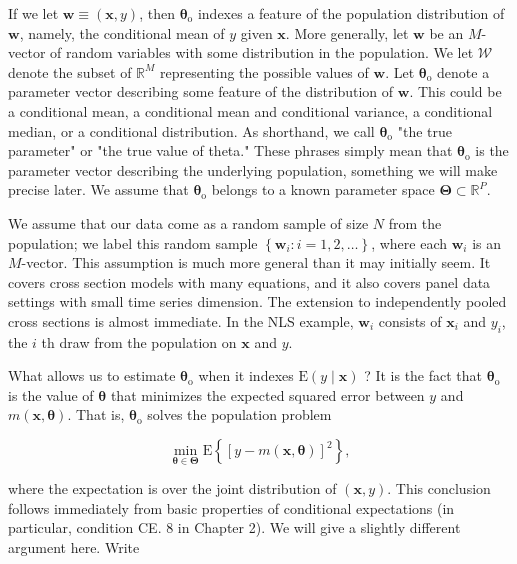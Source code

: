 \documentclass[10pt]{article}
\begin{document}
If we let $\mathbf{w} \equiv(\mathbf{x}, y)$, then $\boldsymbol{\theta}_{\mathrm{o}}$ indexes a feature of the population distribution of $\mathbf{w}$, namely, the conditional mean of $y$ given $\mathbf{x}$. More generally, let $\mathbf{w}$ be an $M$-vector of random variables with some distribution in the population. We let $\mathscr{W}$ denote the subset of $\mathbb{R}^{M}$ representing the possible values of $\mathbf{w}$. Let $\boldsymbol{\theta}_{\mathrm{o}}$ denote a parameter vector describing some feature of the distribution of $\mathbf{w}$. This could be a conditional mean, a conditional mean and conditional variance, a conditional median, or a conditional distribution. As shorthand, we call $\boldsymbol{\theta}_{\mathrm{o}}$ "the true parameter" or "the true value of theta." These phrases simply mean that $\boldsymbol{\theta}_{\mathrm{o}}$ is the parameter vector describing the underlying population, something we will make precise later. We assume that $\boldsymbol{\theta}_{\mathrm{o}}$ belongs to a known parameter space $\boldsymbol{\Theta} \subset \mathbb{R}^{P}$.

We assume that our data come as a random sample of size $N$ from the population; we label this random sample $\left\{\mathbf{w}_{i}: i=1,2, \ldots\right\}$, where each $\mathbf{w}_{i}$ is an $M$-vector. This assumption is much more general than it may initially seem. It covers cross section models with many equations, and it also covers panel data settings with small time series dimension. The extension to independently pooled cross sections is almost immediate. In the NLS example, $\mathbf{w}_{i}$ consists of $\mathbf{x}_{i}$ and $y_{i}$, the $i$ th draw from the population on $\mathbf{x}$ and $y$.

What allows us to estimate $\boldsymbol{\theta}_{\mathrm{o}}$ when it indexes $\mathrm{E}(y \mid \mathbf{x})$ ? It is the fact that $\boldsymbol{\theta}_{\mathrm{o}}$ is the value of $\boldsymbol{\theta}$ that minimizes the expected squared error between $y$ and $m(\mathbf{x}, \boldsymbol{\theta})$. That is, $\boldsymbol{\theta}_{\mathrm{o}}$ solves the population problem


\begin{equation*}
\min _{\boldsymbol{\theta} \in \boldsymbol{\Theta}} \mathrm{E}\left\{[y-m(\mathbf{x}, \boldsymbol{\theta})]^{2}\right\}, \tag{12.3}
\end{equation*}


where the expectation is over the joint distribution of $(\mathbf{x}, y)$. This conclusion follows immediately from basic properties of conditional expectations (in particular, condition CE. 8 in Chapter 2). We will give a slightly different argument here. Write
\end{document}
